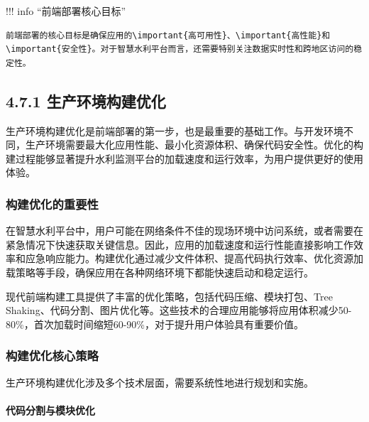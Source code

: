 !!! info ``前端部署核心目标''

\begin{verbatim}
前端部署的核心目标是确保应用的\important{高可用性}、\important{高性能}和\important{安全性}。对于智慧水利平台而言，还需要特别关注数据实时性和跨地区访问的稳定性。
\end{verbatim}

\hypertarget{ux751fux4ea7ux73afux5883ux6784ux5efaux4f18ux5316}{%
\subsection{4.7.1 生产环境构建优化}\label{ux751fux4ea7ux73afux5883ux6784ux5efaux4f18ux5316}}

生产环境构建优化是前端部署的第一步，也是最重要的基础工作。与开发环境不同，生产环境需要最大化应用性能、最小化资源体积、确保代码安全性。优化的构建过程能够显著提升水利监测平台的加载速度和运行效率，为用户提供更好的使用体验。

\hypertarget{ux6784ux5efaux4f18ux5316ux7684ux91cdux8981ux6027}{%
\subsubsection{构建优化的重要性}\label{ux6784ux5efaux4f18ux5316ux7684ux91cdux8981ux6027}}

在智慧水利平台中，用户可能在网络条件不佳的现场环境中访问系统，或者需要在紧急情况下快速获取关键信息。因此，应用的加载速度和运行性能直接影响工作效率和应急响应能力。构建优化通过减少文件体积、提高代码执行效率、优化资源加载策略等手段，确保应用在各种网络环境下都能快速启动和稳定运行。

现代前端构建工具提供了丰富的优化策略，包括代码压缩、模块打包、Tree Shaking、代码分割、图片优化等。这些技术的合理应用能够将应用体积减少50-80\%，首次加载时间缩短60-90\%，对于提升用户体验具有重要价值。

\hypertarget{ux6784ux5efaux4f18ux5316ux6838ux5fc3ux7b56ux7565}{%
\subsubsection{构建优化核心策略}\label{ux6784ux5efaux4f18ux5316ux6838ux5fc3ux7b56ux7565}}

生产环境构建优化涉及多个技术层面，需要系统性地进行规划和实施。

\hypertarget{ux4ee3ux7801ux5206ux5272ux4e0eux6a21ux5757ux4f18ux5316}{%
\paragraph{代码分割与模块优化}\label{ux4ee3ux7801ux5206ux5272ux4e0eux6a21ux5757ux4f18ux5316}}

